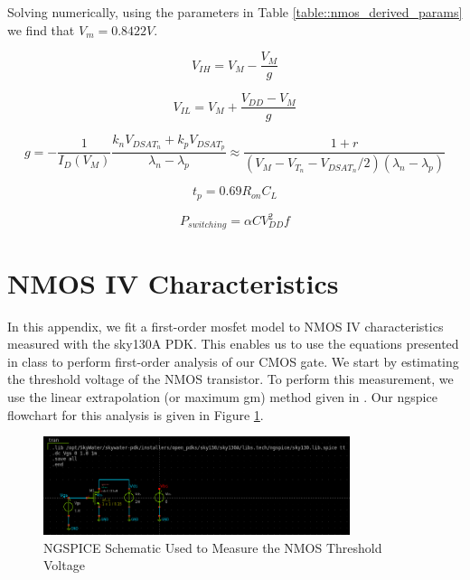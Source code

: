 \documentclass[fleqn]{article}
\begin{document}
	Solving numerically, using the parameters in Table \ref{table::nmos_derived_params} we find that $V_m = 0.8422 V$.
	
	\begin{equation}
		V_{IH} = V_{M} - \frac{V_M}{g}
	\end{equation}
	
	\begin{equation}
		V_{IL} = V_{M} + \frac{V_{DD} - V_M}{g}
	\end{equation}
	
	\begin{equation}
		g = -\frac{1}{I_D(V_M)}\frac{k_nV_{DSAT_n} + k_pV_{DSAT_p}}{\lambda_n - \lambda_p} \approx \frac{1 + r}{(V_M - V_{T_n} - V_{DSAT_n}/2)(\lambda_n - \lambda_p)}
	\end{equation}
	
	\begin{equation}
		t_p = 0.69R_{on}C_L
	\end{equation}
	
	\begin{equation}
		P_{switching} = {\alpha}CV_{DD}^2f
	\end{equation}
	
	
	
	\pagebreak
	\appendix
	\section{NMOS IV Characteristics}
	\label{appendix::nmos_iv_characteristics}
	
	In this appendix, we fit a first-order mosfet model to NMOS IV characteristics measured with the sky130A PDK. This enables us to use the equations presented in class to perform first-order analysis of our CMOS gate. We start by estimating the threshold voltage of the NMOS transistor. To perform this measurement, we use the linear extrapolation (or maximum gm) method given in \cite{cmos_vlsi_design}. Our ngspice flowchart for this analysis is given in Figure \ref{fig::nmos_vt_meas_schem}.
	
	\begin{figure}[H]
		\centerline{\includegraphics[width=0.8\textwidth]{nmos_vt_meas_schem.png}}
		\caption{NGSPICE Schematic Used to Measure the NMOS Threshold Voltage}
		\label{fig::nmos_vt_meas_schem}
	\end{figure}
	
\end{document}
